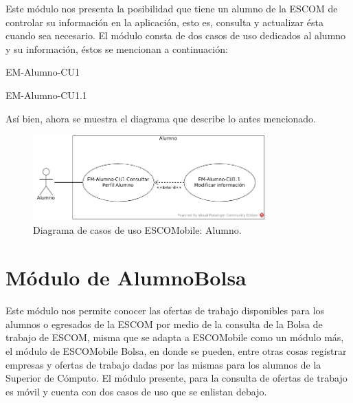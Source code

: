 \noindent
Este módulo nos presenta la posibilidad que tiene un alumno de la ESCOM de controlar su información
en la aplicación, esto es, consulta y actualizar ésta cuando sea necesario. El módulo consta de dos 
casos de uso dedicados al alumno y su información, éstos se mencionan a continuación:

\begin{requisitos}{EM-Alumno-CU1}
\end{requisitos}

\begin{requisitos}{EM-Alumno-CU1.1}
\end{requisitos}

\noindent
Así bien, ahora se muestra el diagrama que describe lo antes mencionado. 

\pagebreak
\begin{figure}[htbp!]
	\centering
	\includegraphics[width=0.8\textwidth]{images/casos/alumno}
	\caption{Diagrama de casos de uso ESCOMobile: Alumno.}
\end{figure}




\section{Módulo de AlumnoBolsa}

\noindent
Este módulo nos permite conocer las ofertas de trabajo disponibles para los alumnos o egresados de la ESCOM
por medio de la consulta de la Bolsa de trabajo de ESCOM, misma que se adapta a ESCOMobile como un módulo más, 
el módulo de ESCOMobile Bolsa, en donde se pueden, entre otras cosas registrar empresas y ofertas de trabajo
dadas por las mismas para los alumnos de la Superior de Cómputo. 
El módulo presente, para la consulta de ofertas de trabajo es móvil y cuenta con dos casos de uso que se
enlistan debajo.

